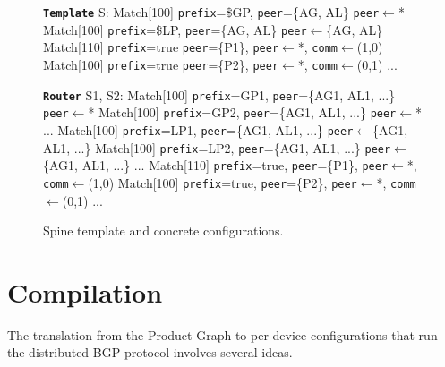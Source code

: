 \documentclass[numbers, 10pt, preprint]{sigplanconf}
\newcommand{\KW}[1]{\texttt{\small\bfseries{#1}}}
\begin{document}
%
%
%
%

\newcommand{\highlight}[1]{%
  \colorbox{red!50}{$\displaystyle#1$}}
\newcommand{\Router}[1]{\KW{Router} #1:}
\newcommand{\Template}[1]{\KW{Template} #1:}
\newcommand{\REGEX}[1]{\texttt{regex}(#1)}
\newcommand{\PEER}{\texttt{peer}}
\newcommand{\PREFIX}{\texttt{prefix}}
\newcommand{\IF}{\texttt{if}}
\newcommand{\THEN}{\texttt{then}}
\newcommand{\COMM}{\texttt{comm}}
\newcommand{\MED}{\texttt{MED}}
\newcommand{\Arrow}{\ensuremath{\leftarrow}}

\begin{figure}[t!]
  \begin{code}
    \Template{S}
      Match[100] \PREFIX=\$GP, \PEER=\{AG, AL\}
        \PEER \Arrow *
      Match[100] \PREFIX=\$LP, \PEER=\{AG, AL\}
        \PEER \Arrow \{AG, AL\}
      Match[110] \PREFIX=true \PEER=\{P1\},
        \PEER \Arrow *, \COMM \Arrow (1,0)
      Match[100] \PREFIX=true \PEER=\{P2\},
        \PEER \Arrow *, \COMM \Arrow (0,1)
      ...
  \end{code}

  \vspace{-2em}
  \begin{code}
    \Router{S1, S2}
      Match[100] \PREFIX=GP1, \PEER=\{AG1, AL1, ...\}
        \PEER \Arrow *
      Match[100] \PREFIX=GP2, \PEER=\{AG1, AL1, ...\}
        \PEER \Arrow *
      ...
      Match[100] \PREFIX=LP1, \PEER=\{AG1, AL1, ...\}
        \PEER \Arrow \{AG1, AL1, ...\}
      Match[100] \PREFIX=LP2, \PEER=\{AG1, AL1, ...\}
        \PEER \Arrow \{AG1, AL1, ...\}
      ...
      Match[110] \PREFIX=true, \PEER=\{P1\},
        \PEER \Arrow *, \COMM \Arrow (1,0)
      Match[100] \PREFIX=true, \PEER=\{P2\},
        \PEER \Arrow *, \COMM \Arrow (0,1)
      ...
    \end{code}

  \vspace{-1em}
  \caption{Spine template and concrete configurations.}
  \label{fig:bgp-configs}
\end{figure}


\section{Compilation}

The translation from the Product Graph to per-device configurations that run the distributed BGP protocol involves several ideas.
\end{document}
